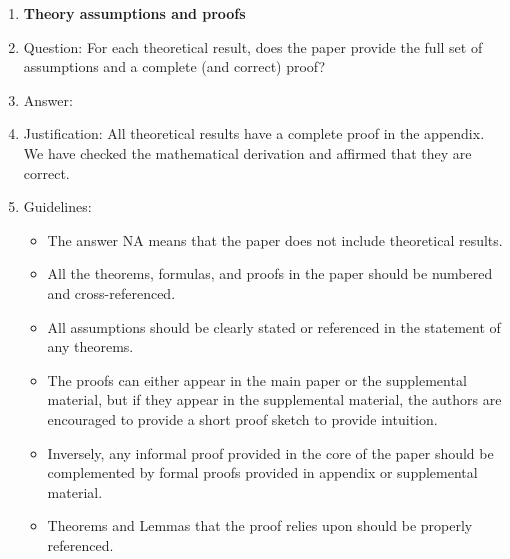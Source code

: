 \documentclass{article}
\theoremstyle{remark}
\begin{document}
\begin{enumerate}
\item {\bf Theory assumptions and proofs}
    \item[] Question: For each theoretical result, does the paper provide the full set of assumptions and a complete (and correct) proof?
    \item[] Answer: \answerYes{} %
    \item[] Justification: All theoretical results have a complete proof in the appendix. We have checked the mathematical derivation and affirmed that they are correct.
    \item[] Guidelines:
    \begin{itemize}
        \item The answer NA means that the paper does not include theoretical results. 
        \item All the theorems, formulas, and proofs in the paper should be numbered and cross-referenced.
        \item All assumptions should be clearly stated or referenced in the statement of any theorems.
        \item The proofs can either appear in the main paper or the supplemental material, but if they appear in the supplemental material, the authors are encouraged to provide a short proof sketch to provide intuition. 
        \item Inversely, any informal proof provided in the core of the paper should be complemented by formal proofs provided in appendix or supplemental material.
        \item Theorems and Lemmas that the proof relies upon should be properly referenced. 
    \end{itemize}


\end{enumerate}
\end{document}
